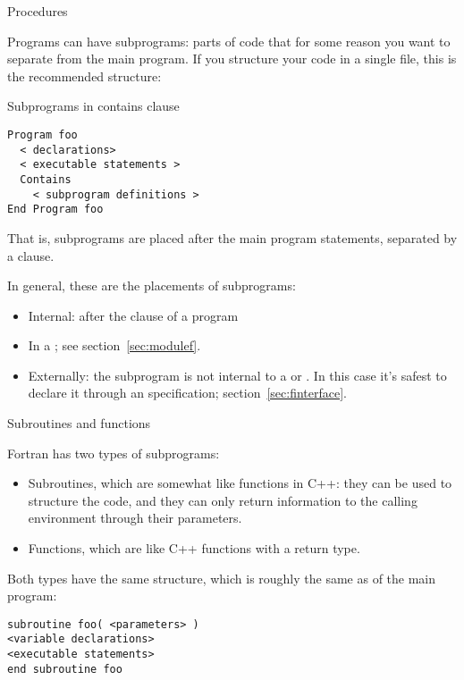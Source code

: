 
 {Procedures}

Programs can have subprograms: parts of code that for some reason you
want to separate from the main program. If you structure your code in a single
file, this is the recommended structure:

\begin{block}{Subprograms in contains clause}
  \label{sl:contains}
\begin{verbatim}
Program foo
  < declarations>
  < executable statements >
  Contains
    < subprogram definitions >
End Program foo
\end{verbatim}
\end{block}

That is, subprograms are placed after the main program statements,
separated by a  clause.

In general, these are the  placements of subprograms:
\begin{itemize}
\item Internal: after the  clause of a program
\item In a ; see section~\ref{sec:modulef}.
\item Externally: the subprogram is not internal to a  or
  . In this case it's safest to declare it through an
   specification; section~\ref{sec:finterface}.
\end{itemize}
 {Subroutines and functions}

Fortran has two types of subprograms:
\begin{itemize}
\item Subroutines, which are somewhat like  functions in C++:
  they can be used to structure the code, and they can only return
  information to the calling environment through their parameters.
\item Functions, which are like C++ functions with a return type.
\end{itemize}

Both types have the same structure, which is roughly the same as of
the main program:
\begin{verbatim}
subroutine foo( <parameters> )
<variable declarations>
<executable statements>
end subroutine foo
\end{verbatim}

